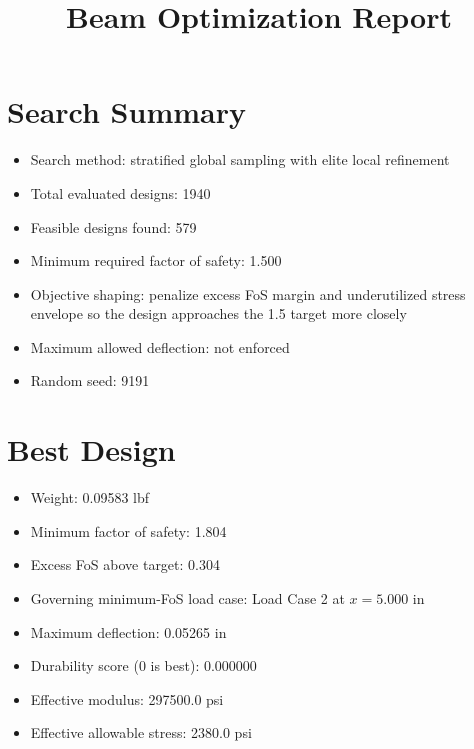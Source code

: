 \documentclass[11pt]{article}
\title{Beam Optimization Report}
\date{}
\begin{document}
\maketitle

\section*{Search Summary}
\begin{itemize}
\item Search method: stratified global sampling with elite local refinement
\item Total evaluated designs: 1940
\item Feasible designs found: 579
\item Minimum required factor of safety: 1.500
\item Objective shaping: penalize excess FoS margin and underutilized stress envelope so the design approaches the 1.5 target more closely
\item Maximum allowed deflection: not enforced
\item Random seed: 9191
\end{itemize}

\section*{Best Design}
\begin{itemize}
\item Weight: 0.09583 lbf
\item Minimum factor of safety: 1.804
\item Excess FoS above target: 0.304
\item Governing minimum-FoS load case: Load Case 2 at $x=5.000$ in
\item Maximum deflection: 0.05265 in
\item Durability score (0 is best): 0.000000
\item Effective modulus: 297500.0 psi
\item Effective allowable stress: 2380.0 psi
\end{itemize}
\end{document}
